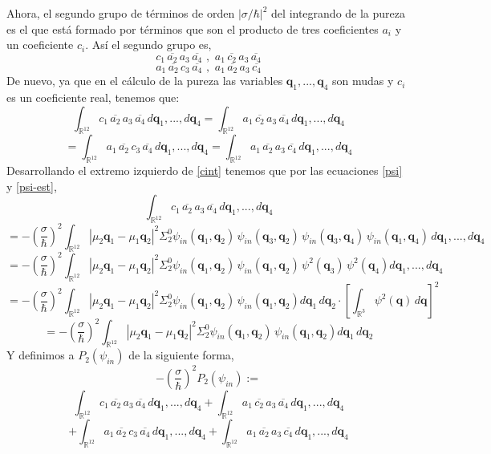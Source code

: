 \documentclass[12pt]{book}
\numberwithin{equation}{chapter}
\def\q{\mathbf{q}}
\def\R{\mathbb{R}}
\begin{document}
Ahora, el segundo grupo de t\'erminos de orden $|\sigma/\hbar|^{2}$ del integrando de la pureza es el que est\'a formado por t\'erminos que son el producto de tres coeficientes $a_{i}$ y un coeficiente $c_{i}$. As\'i el segundo grupo es,
$$ c_{1}\,\overline{a_{2}}\,a_{3}\,\overline{a_{4}}  \,\,,\,\,  a_{1}\, \overline{c_{2}}\, a_{3}\, \overline{a_{4}}$$
$$ a_{1}\,\overline{a_{2}}\,c_{3}\,\overline{a_{4}}  \,\,,\,\,  a_{1}\, \overline{a_{2}}\, a_{3}\, \overline{c_{4}}$$
De nuevo, ya que en el c\'alculo de la pureza las variables $\q_{1},...,\q_{4}$ son mudas y $c_{i}$ es un coeficiente real, tenemos que:
$$ \int_{\R^{12}} c_{1}\,\overline{a_{2}}\,a_{3}\,\overline{a_{4}} \,d\q_{1},...,d\q_{4}=\int_{\R^{12}} a_{1}\, \overline{c_{2}}\, a_{3}\, \overline{a_{4}} \,d\q_{1},...,d\q_{4}$$
\begin{equation}\label{cint}
= \int_{\R^{12}} a_{1}\,\overline{a_{2}}\,c_{3}\,\overline{a_{4}} \,d\q_{1},...,d\q_{4}
=\int_{\R^{12}} a_{1}\,\overline{a_{2}}\,a_{3}\,\overline{c_{4}} \,d\q_{1},...,d\q_{4}
\end{equation}
Desarrollando el extremo izquierdo de \eqref{cint} tenemos que por las ecuaciones \eqref{psi} y \eqref{psi-est},
$$\int_{\R^{12}} c_{1}\,\overline{a_{2}}\,a_{3}\,\overline{a_{4}} \,d\q_{1},...,d\q_{4} $$
$$= -\left( \frac{\sigma}{\hbar} \right)^{2} \int_{\R^{12}}  |\mu_{2}\q_{1}-\mu_{1}\q_{2}|^{2} \Sigma_{2}^{0} \psi_{in}(\q_{1},\q_{2})\,\psi_{in}(\q_{3},\q_{2})\,\psi_{in}(\q_{3},\q_{4})\, \psi_{in}(\q_{1},\q_{4})\, d\q_{1},...,d\q_{4} $$
$$= -\left( \frac{\sigma}{\hbar} \right)^{2} \int_{\R^{12}}  |\mu_{2}\q_{1}-\mu_{1}\q_{2}|^{2} \Sigma_{2}^{0} \psi_{in}(\q_{1},\q_{2})\,\psi_{in}(\q_{1},\q_{2})\, \psi^{2}(\q_{3}) \, \psi^{2}(\q_{4})  d\q_{1},...,d\q_{4} $$
$$= -\left( \frac{\sigma}{\hbar} \right)^{2} \int_{\R^{12}}  |\mu_{2}\q_{1}-\mu_{1}\q_{2}|^{2} \Sigma_{2}^{0} \psi_{in}(\q_{1},\q_{2})\,\psi_{in}(\q_{1},\q_{2})  d\q_{1}\, d\q_{2} \cdot \left[\int_{\R^{3}} \psi^{2}(\q) \, d\q \right]^{2} $$
$$= -\left( \frac{\sigma}{\hbar} \right)^{2} \int_{\R^{12}}  |\mu_{2}\q_{1}-\mu_{1}\q_{2}|^{2} \Sigma_{2}^{0} \psi_{in}(\q_{1},\q_{2})\,\psi_{in}(\q_{1},\q_{2})  d\q_{1}\, d\q_{2} $$
Y definimos a $P_{2}(\psi_{in})$ de la siguiente forma,
$$- \left( \frac{\sigma}{\hbar} \right)^{2} P_{2}(\psi_{in}):= $$
$$ \int_{\R^{12}} c_{1}\,\overline{a_{2}}\,a_{3}\,\overline{a_{4}} \,d\q_{1},...,d\q_{4}+\int_{\R^{12}} a_{1}\, \overline{c_{2}}\, a_{3}\, \overline{a_{4}} \,d\q_{1},...,d\q_{4}$$
$$+ \int_{\R^{12}} a_{1}\,\overline{a_{2}}\,c_{3}\,\overline{a_{4}} \,d\q_{1},...,d\q_{4}
+\int_{\R^{12}} a_{1}\,\overline{a_{2}}\,a_{3}\,\overline{c_{4}} \,d\q_{1},...,d\q_{4}$$
\end{document}
